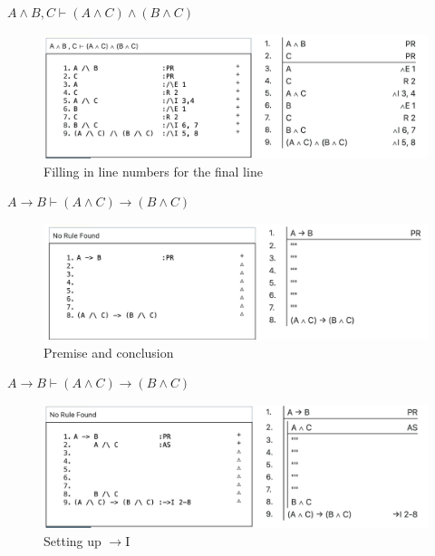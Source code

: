 \documentclass[
  ignorenonframetext,
]{beamer}
\renewcommand{\,}{\text{, }}
\begin{document}
\begin{frame}{\(A \wedge B, C \vdash (A \wedge C) \wedge (B \wedge C)\)}
\protect\hypertarget{a-wedge-b-c-vdash-a-wedge-c-wedge-b-wedge-c-6}{}
\begin{figure}
\centering
\includegraphics[width=\textwidth,height=0.75\textheight]{5_4g.png}
\caption{Filling in line numbers for the final line}
\end{figure}
\end{frame}

\begin{frame}{\(A \rightarrow B \vdash (A \wedge C) \rightarrow (B \wedge C)\)}
\protect\hypertarget{a-rightarrow-b-vdash-a-wedge-c-rightarrow-b-wedge-c}{}
\begin{figure}
\centering
\includegraphics[width=\textwidth,height=0.75\textheight]{5_4h.png}
\caption{Premise and conclusion}
\end{figure}
\end{frame}

\begin{frame}{\(A \rightarrow B \vdash (A \wedge C) \rightarrow (B \wedge C)\)}
\protect\hypertarget{a-rightarrow-b-vdash-a-wedge-c-rightarrow-b-wedge-c-1}{}
\begin{figure}
\centering
\includegraphics[width=\textwidth,height=0.75\textheight]{5_4i.png}
\caption{Setting up \(\rightarrow\)I}
\end{figure}
\end{frame}
\end{document}

